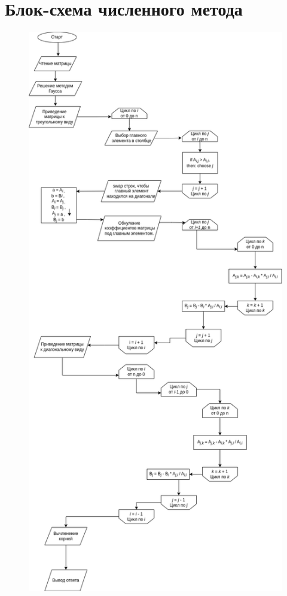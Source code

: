 \section{Блок-схема численного метода}
\begin{figure}[H]
    \centering
    \includegraphics[scale=0.3]{img/блок-схема}
\end{figure}
\newpage
\thispagestyle{empty}
\BgThispage


